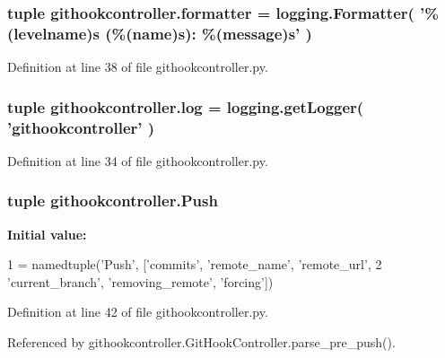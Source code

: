 \subsubsection[{formatter}]{\setlength{\rightskip}{0pt plus 5cm}tuple githookcontroller.\-formatter = logging.\-Formatter( '\%(levelname)s (\%(name)s)\-: \%(message)s' )}\label{namespacegithookcontroller_a8672f684f117c8c4733546a0bc9e9616}


Definition at line 38 of file githookcontroller.\-py.

\subsubsection[{log}]{\setlength{\rightskip}{0pt plus 5cm}tuple githookcontroller.\-log = logging.\-get\-Logger( 'githookcontroller' )}\label{namespacegithookcontroller_a3bbdf7a562461bd3baca4ef635d6dd50}


Definition at line 34 of file githookcontroller.\-py.

\subsubsection[{Push}]{\setlength{\rightskip}{0pt plus 5cm}tuple githookcontroller.\-Push}\label{namespacegithookcontroller_ae617d8e0c886ed4e082bd11f1f33bd0d}
{\bfseries Initial value\-:}
\begin{DoxyCode}
1 = namedtuple(\textcolor{stringliteral}{'Push'}, [\textcolor{stringliteral}{'commits'}, \textcolor{stringliteral}{'remote\_name'}, \textcolor{stringliteral}{'remote\_url'},
2                            \textcolor{stringliteral}{'current\_branch'}, \textcolor{stringliteral}{'removing\_remote'}, \textcolor{stringliteral}{'forcing'}])
\end{DoxyCode}


Definition at line 42 of file githookcontroller.\-py.



Referenced by githookcontroller.\-Git\-Hook\-Controller.\-parse\-\_\-pre\-\_\-push().

